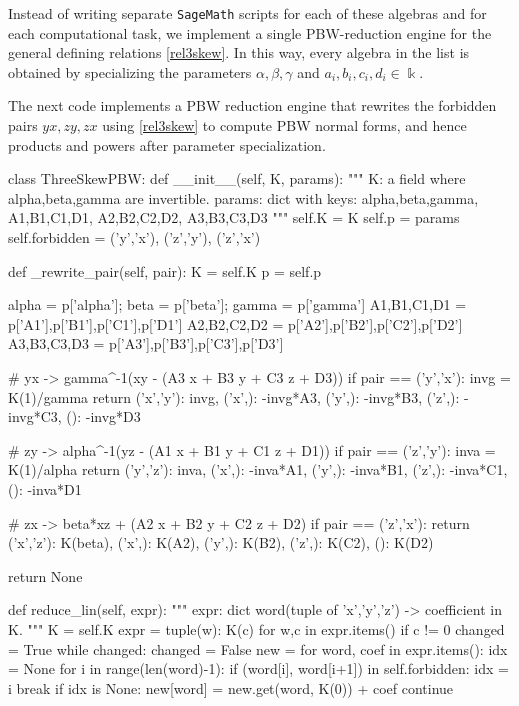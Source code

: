 \documentclass{amsart}
\theoremstyle{definition}
\theoremstyle{remark}
\numberwithin{equation}{section}
\begin{document}
Instead of writing separate \texttt{SageMath} scripts for each of these algebras and for each computational task, we implement a single PBW-reduction engine for the general defining relations \eqref{rel3skew}. In this way, every algebra in the list is obtained by specializing the parameters $\alpha, \beta, \gamma$ and $a_i,b_i,c_i,d_i \in \Bbbk$.

The next code implements a PBW reduction engine  that rewrites the forbidden pairs $yx,zy,zx$ using \eqref{rel3skew} to compute PBW normal forms, and hence products and powers after parameter specialization.

\begin{MyVerbatim}
class ThreeSkewPBW:
    def __init__(self, K, params):
        """
        K: a field where alpha,beta,gamma are invertible.
        params: dict with keys:
          alpha,beta,gamma, A1,B1,C1,D1, A2,B2,C2,D2, A3,B3,C3,D3
        """
        self.K = K
        self.p = params
        self.forbidden = {('y','x'), ('z','y'), ('z','x')}

    def _rewrite_pair(self, pair):
        K = self.K
        p = self.p

        alpha = p['alpha']; beta = p['beta']; gamma = p['gamma']
        A1,B1,C1,D1 = p['A1'],p['B1'],p['C1'],p['D1']
        A2,B2,C2,D2 = p['A2'],p['B2'],p['C2'],p['D2']
        A3,B3,C3,D3 = p['A3'],p['B3'],p['C3'],p['D3']

        # yx -> gamma^{-1}(xy - (A3 x + B3 y + C3 z + D3))
        if pair == ('y','x'):
            invg = K(1)/gamma
            return {
                ('x','y'): invg,
                ('x',):   -invg*A3,
                ('y',):   -invg*B3,
                ('z',):   -invg*C3,
                ():       -invg*D3
            }

        # zy -> alpha^{-1}(yz - (A1 x + B1 y + C1 z + D1))
        if pair == ('z','y'):
            inva = K(1)/alpha
            return {
                ('y','z'): inva,
                ('x',):    -inva*A1,
                ('y',):    -inva*B1,
                ('z',):    -inva*C1,
                ():        -inva*D1
            }

        # zx -> beta*xz + (A2 x + B2 y + C2 z + D2)
        if pair == ('z','x'):
            return {
                ('x','z'): K(beta),
                ('x',):    K(A2),
                ('y',):    K(B2),
                ('z',):    K(C2),
                ():        K(D2)
            }

        return None

    def reduce_lin(self, expr):
        """
        expr: dict word(tuple of 'x','y','z') -> coefficient in K.
        """
        K = self.K
        expr = {tuple(w): K(c) for w,c in expr.items() if c != 0}
        changed = True
        while changed:
            changed = False
            new = {}
            for word, coef in expr.items():
                idx = None
                for i in range(len(word)-1):
                    if (word[i], word[i+1]) in self.forbidden:
                        idx = i
                        break
                if idx is None:
                    new[word] = new.get(word, K(0)) + coef
                    continue


\end{MyVerbatim}
\end{document}
